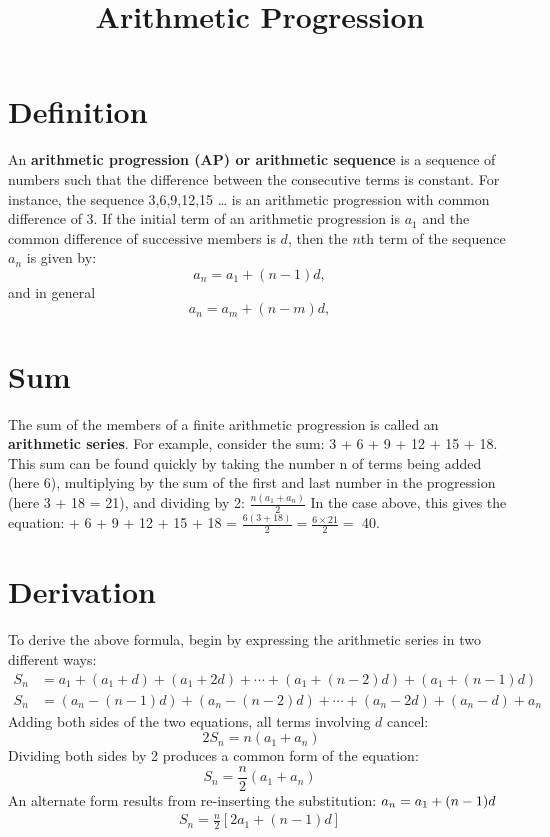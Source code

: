 \documentclass{article}
\title{Arithmetic Progression}
\date{}
\begin{document}
\maketitle
\date{}
\section*{Definition}
An \textbf{arithmetic progression (AP) or arithmetic sequence} is a sequence of numbers such that the difference between the consecutive terms is constant. For instance, the sequence 3,6,9,12,15 … is an arithmetic progression with common difference of 3.\newline
If the initial term of an arithmetic progression is ${a_1}$ and the common difference of successive members is $d$, then the $n$th term of the sequence ${a_n}$ is given by:
\begin{equation*}
a_n = a_1 + (n - 1)d,
\end{equation*}
and in general
\begin{equation*}
a_n = a_m + (n - m	)d,
\end{equation*}
\section*{Sum}	
The sum of the members of a finite arithmetic progression is called an \textbf{arithmetic series}. For example, consider the sum:
3 + 6 + 9 + 12 + 15 + 18.
This sum can be found quickly by taking the number n of terms being added (here 6), multiplying by the sum of the first and last number in the progression (here 3 + 18 = 21), and dividing by 2:\newline
$\frac{n(a_1 + a_n)}{2}$\newline
In the case above, this gives the equation: + 6 + 9 + 12 + 15 + 18 = $\frac{6(3 + 18)}{2} = \frac{6 \times 21}{2} =$ 40.
\section*{Derivation}
To derive the above formula, begin by expressing the arithmetic series in two different ways:
\begin{align*}
 S_n &= a_1 + (a_1+d) + (a_1+2d) + \cdots + (a_1+(n-2)d) + (a_1+(n-1)d)\\
 S_n &=(a_n-(n-1)d)+(a_n-(n-2)d)+\cdots+(a_n-2d)+(a_n-d)+a_n
\end{align*}
Adding both sides of the two equations, all terms involving $d$ cancel:
\begin{equation*}
\ 2S_n=n(a_1 + a_n)
\end{equation*}
Dividing both sides by 2 produces a common form of the equation:
\begin{equation*}
 S_n=\frac{n}{2}( a_1 + a_n)
 \end{equation*}
An alternate form results from re-inserting the substitution: $ a_n = a_1 + (n-1)d\\ $
\begin{gather*}
S_n=\frac{n}{2}[ 2a_1 + (n-1)d]
\end{gather*}
\end{document}
